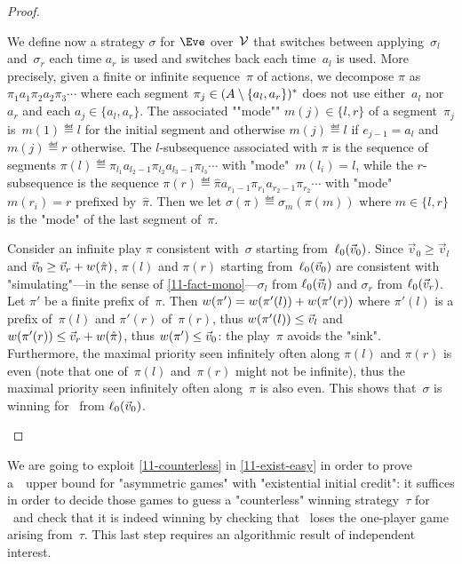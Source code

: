 \begin{proof}
  \begin{scope}
    We define now a strategy $\sigma$ for $\Eve$ over~$\mathcal V$ that
    switches between applying~$\sigma_l$ and~$\sigma_r$ each time
    $a_r$ is used and switches back each time~$a_l$ is used.  More
    precisely, given a finite or infinite sequence~$\pi$ of actions,
    we decompose $\pi$ as $\pi_1 a_1 \pi_2 a_2 \pi_3\cdots$ where each
    segment $\pi_j\in(A\setminus\{a_l,a_r\})^\ast$ does not use
    either~$a_l$ nor~$a_r$ and each $a_j\in\{a_l,a_r\}$.  The
    associated ""mode"" $m(j)\in\{l,r\}$ of a segment~$\pi_j$
    is~$m(1)\eqdef l$ for the initial segment and otherwise
    $m(j)\eqdef l$ if $e_{j-1}=a_l$ and $m(j)\eqdef r$ otherwise.  The
    $l$-subsequence associated with $\pi$ is the sequence of segments
    $\pi(l)\eqdef\pi_{l_1}a_{l_2-1}\pi_{l_2}a_{l_3-1}\pi_{l_3}\cdots$
    with "mode"~$m(l_i)=l$, while the $r$-subsequence is the sequence
    $\pi(r)\eqdef\hat\pi a_{r_1-1}\pi_{r_1}a_{r_2-1}\pi_{r_2}\cdots$
    with "mode"~$m(r_i)=r$ prefixed by~$\hat\pi$.  Then we let
    $\sigma(\pi)\eqdef\sigma_{m}(\pi(m))$ where $m\in\{l,r\}$ is the
    "mode" of the last segment of~$\pi$.

    Consider an infinite play $\pi$ consistent with~$\sigma$ starting
    from~$\ell_0(\vec v_0)$.  Since $\vec v_0\geq\vec v_l$ and
    $\vec v_0\geq \vec v_r+w(\hat\pi)$, $\pi(l)$ and $\pi(r)$
    starting from~$\ell_0(\vec v_0)$ are consistent with
    "simulating"---in the sense of \cref{11-fact-mono}---$\sigma_l$
    from $\ell_0(\vec v_l)$ and $\sigma_r$ from $\ell_0(\vec v_r)$.
    Let $\pi'$ be a finite prefix of~$\pi$.  Then
    $w(\pi')=w(\pi'(l))+w(\pi'(r))$ where $\pi'(l)$
    is a prefix of~$\pi(l)$ and $\pi'(r)$ of~$\pi(r)$, thus
    $w(\pi'(l))\leq\vec v_l$ and
    $w(\pi'(r))\leq\vec v_r+w(\hat\pi)$, thus
    $w(\pi')\leq\vec v_0$: the play~$\pi$ avoids the "sink".
    Furthermore, the maximal priority seen infinitely often along
    $\pi(l)$ and $\pi(r)$ is even (note that one of~$\pi(l)$
    and~$\pi(r)$ might not be infinite), thus the maximal priority
    seen infinitely often along~$\pi$ is also even.  This shows
    that~$\sigma$ is winning for \Eve\ from $\ell_0(\vec v_0)$.
  \end{scope}
\end{proof}

We are going to exploit \cref{11-counterless} in \cref{11-exist-easy}
in order to prove a~\coNP\ upper bound for "asymmetric games" with
"existential initial credit": it suffices in order to decide those
games to guess a "counterless" winning strategy~$\tau$ for \Adam\ and
check that it is indeed winning by checking that \Eve\ loses the
one-player game arising from~$\tau$.  This last step requires an
algorithmic result of independent interest.

